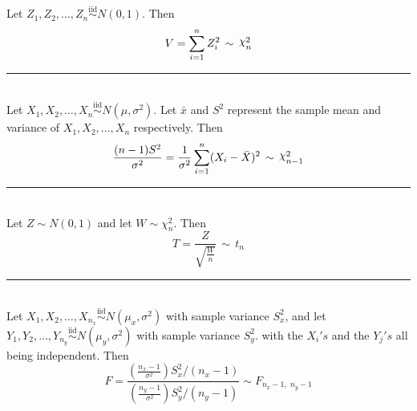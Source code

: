 \documentclass{article}
\newcommand{\HRuleLight}{\rule{\linewidth}{0.1mm}}
\DeclareRobustCommand{\rchi}{{\mathpalette\irchi\relax}}
\newcommand{\irchi}[2]{\raisebox{\depth}{$#1\chi$}} %
\begin{document}
Let $Z_1, Z_2, \ldots, Z_n \overset{\text{iid}}{\sim} N(0, 1)$. Then
\begin{equation*}
	V = \sum_{i = 1}^{n} Z_{i}^2 \, \sim \, \rchi^2_{n}
\end{equation*}

\HRuleLight\\

Let $X_1, X_2, \ldots, X_n \overset{\text{iid}}{\sim} N(\mu, \sigma^2)$. 
Let $\bar{x}$ and $S^2$ represent the sample mean and variance of $X_1, X_2, \ldots, X_n$ respectively.
Then
\begin{equation*}
	\frac{(n-1)S^2}{\sigma^2}
	= \frac{1}{\sigma^2} \sum_{i = 1}^{n} (X_{i} - \bar{X})^2 \, \sim \, \rchi^2_{n-1}
\end{equation*}

\HRuleLight\\
Let $Z \sim N(0, 1)$ and let $W \sim \chi^2_{n}$. Then
\begin{equation*}
	T = \frac{Z}{ \displaystyle\sqrt{ \frac{W}{n}} }	\, \sim \,	t_{n}
\end{equation*}

\HRuleLight\\

%

Let $X_1, X_2, \ldots, X_{n_x} \overset{\text{iid}}{\sim} N(\mu_x, \sigma^2)$ with
sample variance $S^2_x$,
and
let $Y_1, Y_2, \ldots, Y_{n_y} \overset{\text{iid}}{\sim} N(\mu_y, \sigma^2)$ with
sample variance $S^2_y$.
with the $X_i's$ and the $Y_j's$ all being independent.
Then
\begin{equation*}
	F =
	\frac{ \left( \displaystyle\frac{n_x - 1}{\sigma^2} \right) S^2_x/(n_x - 1)}{ \left( \displaystyle\frac{n_y - 1}{\sigma^2} \right) S^2_y/(n_y - 1) } \sim F_{n_x-1, \,\, n_y-1}
\end{equation*}
\end{document}
